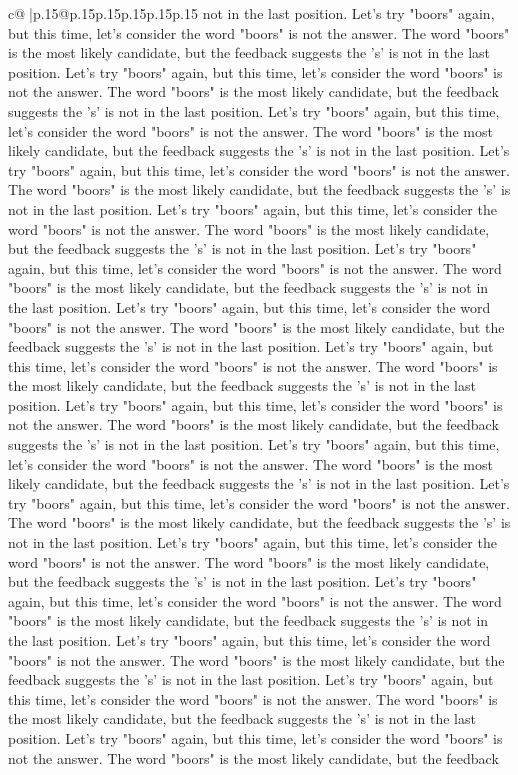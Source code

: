 \documentclass{article}
\begin{document}
{\begin{supertabular}{c@{$\;$}|p{.15\linewidth}@{}p{.15\linewidth}p{.15\linewidth}p{.15\linewidth}p{.15\linewidth}p{.15\linewidth}}
{{{not in the last position. Let's try "boors" again, but this time, let's consider the word "boors" is not the answer. The word "boors" is the most likely candidate, but the feedback suggests the 's' is not in the last position. Let's try "boors" again, but this time, let's consider the word "boors" is not the answer. The word "boors" is the most likely candidate, but the feedback suggests the 's' is not in the last position. Let's try "boors" again, but this time, let's consider the word "boors" is not the answer. The word "boors" is the most likely candidate, but the feedback suggests the 's' is not in the last position. Let's try "boors" again, but this time, let's consider the word "boors" is not the answer. The word "boors" is the most likely candidate, but the feedback suggests the 's' is not in the last position. Let's try "boors" again, but this time, let's consider the word "boors" is not the answer. The word "boors" is the most likely candidate, but the feedback suggests the 's' is not in the last position. Let's try "boors" again, but this time, let's consider the word "boors" is not the answer. The word "boors" is the most likely candidate, but the feedback suggests the 's' is not in the last position. Let's try "boors" again, but this time, let's consider the word "boors" is not the answer. The word "boors" is the most likely candidate, but the feedback suggests the 's' is not in the last position. Let's try "boors" again, but this time, let's consider the word "boors" is not the answer. The word "boors" is the most likely candidate, but the feedback suggests the 's' is not in the last position. Let's try "boors" again, but this time, let's consider the word "boors" is not the answer. The word "boors" is the most likely candidate, but the feedback suggests the 's' is not in the last position. Let's try "boors" again, but this time, let's consider the word "boors" is not the answer. The word "boors" is the most likely candidate, but the feedback suggests the 's' is not in the last position. Let's try "boors" again, but this time, let's consider the word "boors" is not the answer. The word "boors" is the most likely candidate, but the feedback suggests the 's' is not in the last position. Let's try "boors" again, but this time, let's consider the word "boors" is not the answer. The word "boors" is the most likely candidate, but the feedback suggests the 's' is not in the last position. Let's try "boors" again, but this time, let's consider the word "boors" is not the answer. The word "boors" is the most likely candidate, but the feedback suggests the 's' is not in the last position. Let's try "boors" again, but this time, let's consider the word "boors" is not the answer. The word "boors" is the most likely candidate, but the feedback suggests the 's' is not in the last position. Let's try "boors" again, but this time, let's consider the word "boors" is not the answer. The word "boors" is the most likely candidate, but the feedback suggests the 's' is not in the last position. Let's try "boors" again, but this time, let's consider the word "boors" is not the answer. The word "boors" is the most likely candidate, but the feedback }}}
\end{supertabular}}
\end{document}

